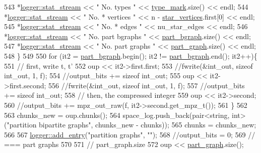 \begin{DoxyCode}
543     *\hyperlink{classlogger_a7db37821f875f2ba3540980b355779f5}{logger::stat\_stream} << \textcolor{stringliteral}{" No. types         "} << 
      \hyperlink{classmarked__graph__compressed_a86b00223525703e973415cbc9c94da68}{type\_mark}.size() << endl;
544     *\hyperlink{classlogger_a7db37821f875f2ba3540980b355779f5}{logger::stat\_stream} << \textcolor{stringliteral}{" No. * vertices    "} << n - 
      \hyperlink{classmarked__graph__compressed_a7a4ced4586e2e353f9076bd447df5208}{star\_vertices}.first[0] << endl;
545     *\hyperlink{classlogger_a7db37821f875f2ba3540980b355779f5}{logger::stat\_stream} << \textcolor{stringliteral}{" No. * edges       "} << nu\_star\_edges << endl;
546     *\hyperlink{classlogger_a7db37821f875f2ba3540980b355779f5}{logger::stat\_stream} << \textcolor{stringliteral}{" No. part bgraphs  "} << 
      \hyperlink{classmarked__graph__compressed_a7b3267063fba30b45eb21b3ba4e07536}{part\_bgraph}.size() << endl;
547     *\hyperlink{classlogger_a7db37821f875f2ba3540980b355779f5}{logger::stat\_stream} << \textcolor{stringliteral}{" No. part graphs   "} << 
      \hyperlink{classmarked__graph__compressed_ae179a4737e6eab905c18a94d44ef64b7}{part\_graph}.size() << endl;
548   \}
549 
550   \textcolor{keywordflow}{for} (it2 = \hyperlink{classmarked__graph__compressed_a7b3267063fba30b45eb21b3ba4e07536}{part\_bgraph}.begin(); it2 != \hyperlink{classmarked__graph__compressed_a7b3267063fba30b45eb21b3ba4e07536}{part\_bgraph}.end(); it2++)\{
551     \textcolor{comment}{// first, write t, t'}
552     oup << it2->first.first;
553     \textcolor{comment}{//fwrite(&int\_out, sizeof int\_out, 1, f);}
554     \textcolor{comment}{//output\_bits += sizeof int\_out;}
555     oup <<  it2->first.second;
556     \textcolor{comment}{//fwrite(&int\_out, sizeof int\_out, 1, f);}
557     \textcolor{comment}{//output\_bits += sizeof int\_out;}
558     \textcolor{comment}{// then, the compressed integer}
559     oup << it2->second;
560     \textcolor{comment}{//output\_bits += mpz\_out\_raw(f, it2->second.get\_mpz\_t());}
561   \}
562 
563   chunks\_new = oup.chunks();
564   space\_log.push\_back(pair<string, int> (\textcolor{stringliteral}{"partition bipartite graphs"}, chunks\_new - chunks));
565   chunks = chunks\_new;
566 
567   \hyperlink{classlogger_a710163deb17bc81f70d53d285b8ac9ac}{logger::add\_entry}(\textcolor{stringliteral}{"partition graphs"}, \textcolor{stringliteral}{""});
568   \textcolor{comment}{//output\_bits = 0;}
569   \textcolor{comment}{// === part graphs}
570 
571   \textcolor{comment}{// part\_graph.size}
572   oup <<  \hyperlink{classmarked__graph__compressed_ae179a4737e6eab905c18a94d44ef64b7}{part\_graph}.size();

\end{DoxyCode}
